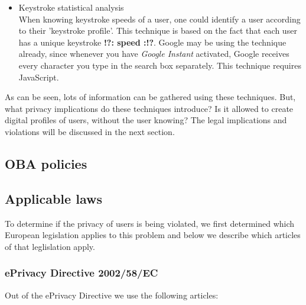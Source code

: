 \documentclass[11pt]{article}
\newcommand{\tocheck}[1]{{\bf !?: #1 :!?}}
\newcommand{\ePD}{ePrivacy Directive }
\begin{document}
\begin{itemize}
	\item Keystroke statistical analysis\\
		When knowing keystroke speeds of a user, one could identify a user according to their 'keystroke profile'. This technique is based on the fact that each user has a unique keystroke \tocheck{speed}. Google may be using the technique already, since whenever you have \textit{Google Instant} activated, Google receives every character you type in the search box separately. \cite{GoogleInstant} This technique requires JavaScript. 
\end{itemize}

As can be seen, lots of information can be gathered using these techniques. But, what privacy implications do these techniques introduce? Is it allowed to create digital profiles of users, without the user knowing? The legal implications and violations will be discussed in the next section.

\subsection{OBA policies}

\subsection{Applicable laws}
To determine if the privacy of users is being violated, we first determined which European legislation applies to this problem and below we describe which articles of that leglislation apply.

\subsubsection{\ePD 2002/58/EC}

Out of the \ePD we use the following articles:
\end{document}

